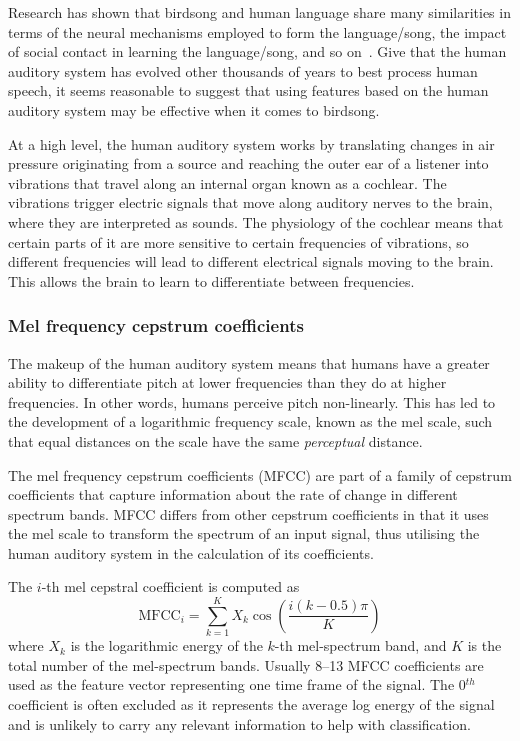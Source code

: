 Research has shown that birdsong and human language share many similarities in
terms of the neural mechanisms employed to form the language/song, the impact of
social contact in learning the language/song, and so on~\cite{birdsongspeech}.
Give that the human auditory system has evolved other thousands of years to best
process human speech, it seems reasonable to suggest that using features based
on the human auditory system may be effective when it comes to birdsong.

At a high level, the human auditory system works by translating changes in air
pressure originating from a source and reaching the outer ear of a listener
into vibrations that travel along an internal organ known as a cochlear. The
vibrations trigger electric signals that move along auditory nerves to the
brain, where they are interpreted as sounds. The physiology of the cochlear
means that certain parts of it are more sensitive to certain frequencies
of vibrations, so different frequencies will lead to different electrical
signals moving to the brain. This allows the brain to learn to differentiate
between frequencies.

\subsubsection{Mel frequency cepstrum coefficients}

The makeup of the human auditory system means that humans have a greater ability
to differentiate pitch at lower frequencies than they do at higher frequencies.
In other words, humans perceive pitch non-linearly. This has led to the
development of a logarithmic frequency scale, known as the mel scale, such that
equal distances on the scale have the same \textit{perceptual} distance.

The mel frequency cepstrum coefficients (MFCC) are part of a family of cepstrum
coefficients that capture information about the rate of change in different
spectrum bands. MFCC differs from other cepstrum coefficients in that it uses the
mel scale to transform the spectrum of an input signal, thus utilising the human
auditory system in the calculation of its coefficients.

The $i$-th mel cepstral coefficient is computed as~\cite{davis1980comparison}
\begin{equation}
\text{MFCC}_i = \sum_{k=1}^{K} X_k \cos \left(
  \frac{i(k-0.5)\pi}{K}
\right)
\end{equation}
where $X_k$ is the logarithmic energy of the $k$-th mel-spectrum band, and $K$
is the total number of the mel-spectrum bands. Usually 8--13 MFCC coefficients
are used as the feature vector representing one time frame of the signal. The
0$^{th}$ coefficient is often excluded as it represents the average log energy
of the signal and is unlikely to carry any relevant information to help with
classification.

